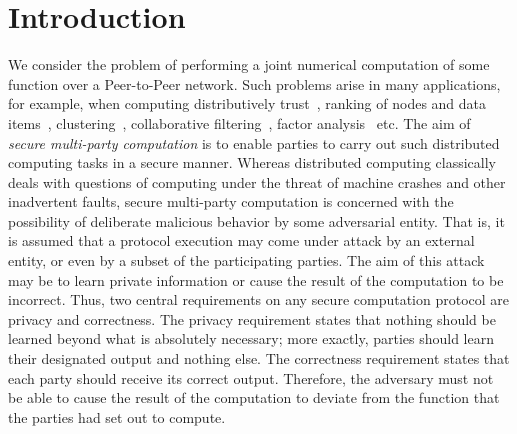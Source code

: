 \documentclass[times, 10pt,twocolumn]{article}
\begin{document}
\section{Introduction}
We consider the problem of performing a joint numerical
computation of some function over a Peer-to-Peer network. Such
problems arise in many applications, for example, when computing
distributively trust~\cite{EigenTrust}, ranking of nodes and data
items~\cite{p2p-rating}, clustering~\cite{EWSN08}, collaborative
filtering~\cite{KorenCF,PP2}, factor analysis~\cite{Canny} etc.
The aim of {\em secure multi-party computation} is to enable
parties to carry out such distributed computing tasks in a secure
manner. Whereas distributed computing classically deals with
questions of computing under the threat of machine crashes and
other inadvertent faults, secure multi-party computation is
concerned with the possibility of deliberate malicious behavior by
some adversarial entity. That is, it is assumed that a protocol
execution may come under attack by an external entity, or even by
a subset of the participating parties. The aim of this attack may
be to learn private information or cause the result of the
computation to be incorrect. Thus, two central requirements on any
secure computation protocol are privacy and correctness. The
privacy requirement states that nothing should be learned beyond
what is absolutely necessary; more exactly, parties should learn
their designated output and nothing else. The correctness
requirement states that each party should receive its correct
output. Therefore, the adversary must not be able to cause the
result of the computation to deviate from the function that the
parties had set out to compute.

\end{document}
